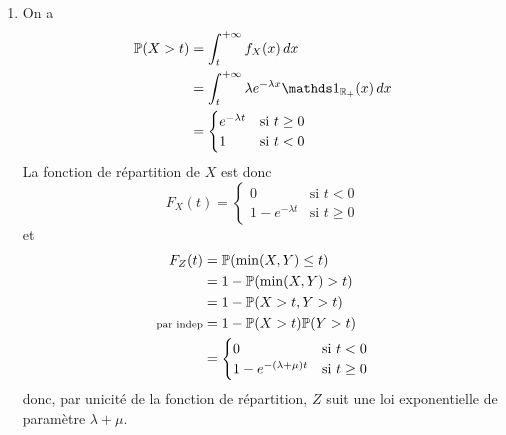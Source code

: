 {\begin{td-sol}[]
\begin{enumerate}
            \item On a
            \begin{equation*}
                \begin{aligned}
                    \bb P(X>t)
                    &= \int_t^{+\infty} f_X(x)\der x\\
                    &= \int_t^{+\infty} \lambda e^{-\lambda x}\one_{\bb R_+}(x)\der x\\
                    &= \begin{cases}
                        e^{-\lambda t} & \text{si } t\geq 0\\
                        1 & \text{si } t<0
                    \end{cases}
                \end{aligned}
            \end{equation*}
            La fonction de répartition de \(X\) est donc
            \begin{equation*}
                F_X(t) = \begin{cases}
                    0 & \text{si } t<0\\
                    1-e^{-\lambda t} & \text{si } t\geq 0
                \end{cases}
            \end{equation*}
            et
            \begin{equation*}
                \begin{aligned}
                    F_Z(t) &= \mathbb{P}(\min(X,Y)\leq t)\\
                    &= 1 - \mathbb{P}(\min(X,Y)>t)\\
                    &= 1 - \mathbb{P}(X>t, Y>t)\\
                    \text{\scriptsize{par indep}}&= 1 - \mathbb{P}(X>t)\mathbb{P}(Y>t)\\
                    &= \begin{cases}
                        0 & \text{si } t<0\\
                        1 - e^{-(\lambda+\mu)t} & \text{si } t\geq 0
                    \end{cases}
                \end{aligned}
            \end{equation*}
            donc, par unicité de la fonction de répartition,
            \(Z\) suit une loi exponentielle de paramètre \(\lambda+\mu\).


\end{enumerate}
\end{td-sol}}
